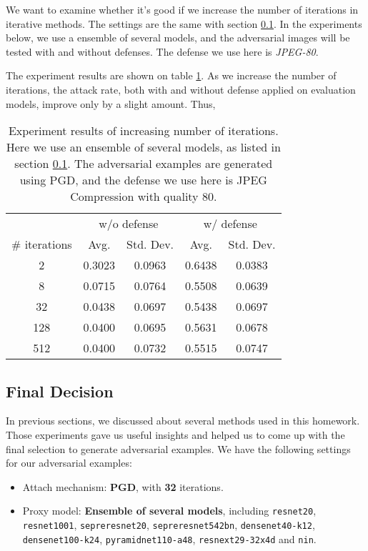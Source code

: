 \documentclass{article}
\begin{document}
We want to examine whether it's good if we increase the number of iterations in iterative methods. The settings are the same with section \ref{final-decision}. In the experiments below, we use a ensemble of several models, and the adversarial images will be tested with and without defenses. The defense we use here is \textit{JPEG-80}.

The experiment results are shown on table \ref{iteration-experiments}. As we increase the number of iterations, the attack rate, both with and without defense applied on evaluation models, improve only by a slight amount. Thus,

\begin{table}
  \label{iteration-experiments}
  \centering
  \caption{
    Experiment results of increasing number of iterations. Here we use an ensemble of several models, as listed in section \ref{final-decision}. The adversarial examples are generated using PGD, and the defense we use here is JPEG Compression with quality 80.
  }
  \begin{tabular}{ccccc}
    \toprule
    & \multicolumn{2}{c}{w/o defense} & \multicolumn{2}{c}{w/ defense} \\
    \cmidrule(r){2-3} \cmidrule(r){4-5}
    \# iterations & Avg. & Std. Dev. & Avg. & Std. Dev. \\
    \midrule
    2             & 0.3023 & 0.0963 & 0.6438 & 0.0383 \\
    8             & 0.0715 & 0.0764 & 0.5508 & 0.0639 \\
    32            & 0.0438 & 0.0697 & 0.5438 & 0.0697 \\
    128           & 0.0400 & 0.0695 & 0.5631 & 0.0678 \\
    512           & 0.0400 & 0.0732 & 0.5515 & 0.0747 \\
    \bottomrule
  \end{tabular}
\end{table}

\subsection{Final Decision}
\label{final-decision}
In previous sections, we discussed about several methods used in this homework. Those experiments gave us useful insights and helped us to come up with the final selection to generate adversarial examples. We have the following settings for our adversarial examples:

\begin{itemize}
  \item Attach mechanism: \textbf{PGD}, with \textbf{32} iterations.
  \item Proxy model: \textbf{Ensemble of several models}, including \texttt{resnet20}, \texttt{resnet1001}, \texttt{sepreresnet20}, \texttt{sepreresnet542bn}, \texttt{densenet40-k12}, \texttt{densenet100-k24}, \texttt{pyramidnet110-a48}, \texttt{resnext29-32x4d} and \texttt{nin}.
\end{itemize}
\end{document}
